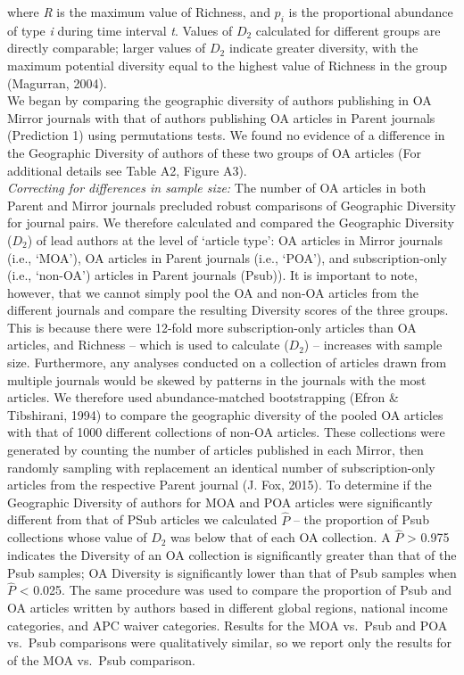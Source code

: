 \documentclass[
  english,
  man]{apa6}
\begin{document}
where \emph{R} is the maximum value of Richness, and \(p_{i}\) is the proportional abundance of type \emph{i} during time interval \emph{t}. Values of \(D_{2}\) calculated for different groups are directly comparable; larger values of \(D_{2}\) indicate greater diversity, with the maximum potential diversity equal to the highest value of Richness in the group (Magurran, 2004).\\
We began by comparing the geographic diversity of authors publishing in OA Mirror journals with that of authors publishing OA articles in Parent journals (Prediction 1) using permutations tests. We found no evidence of a difference in the Geographic Diversity of authors of these two groups of OA articles (For additional details see Table A2, Figure A3).\\
\emph{Correcting for differences in sample size:} The number of OA articles in both Parent and Mirror journals precluded robust comparisons of Geographic Diversity for journal pairs. We therefore calculated and compared the Geographic Diversity (\(D_{2}\)) of lead authors at the level of `article type': OA articles in Mirror journals (i.e., `MOA'), OA articles in Parent journals (i.e., `POA'), and subscription-only (i.e., `non-OA') articles in Parent journals (Psub)). It is important to note, however, that we cannot simply pool the OA and non-OA articles from the different journals and compare the resulting Diversity scores of the three groups. This is because there were 12-fold more subscription-only articles than OA articles, and Richness -- which is used to calculate (\(D_{2}\)) -- increases with sample size. Furthermore, any analyses conducted on a collection of articles drawn from multiple journals would be skewed by patterns in the journals with the most articles. We therefore used abundance-matched bootstrapping (Efron \& Tibshirani, 1994) to compare the geographic diversity of the pooled OA articles with that of 1000 different collections of non-OA articles. These collections were generated by counting the number of articles published in each Mirror, then randomly sampling with replacement an identical number of subscription-only articles from the respective Parent journal (J. Fox, 2015). To determine if the Geographic Diversity of authors for MOA and POA articles were significantly different from that of PSub articles we calculated \(\hat{P}\) -- the proportion of Psub collections whose value of \(D_{2}\) was below that of each OA collection. A \(\hat{P}\) \textgreater{} 0.975 indicates the Diversity of an OA collection is significantly greater than that of the Psub samples; OA Diversity is significantly lower than that of Psub samples when \(\hat{P}\) \textless{} 0.025. The same procedure was used to compare the proportion of Psub and OA articles written by authors based in different global regions, national income categories, and APC waiver categories. Results for the MOA vs.~Psub and POA vs.~Psub comparisons were qualitatively similar, so we report only the results for of the MOA vs.~Psub comparison.\\
\end{document}
